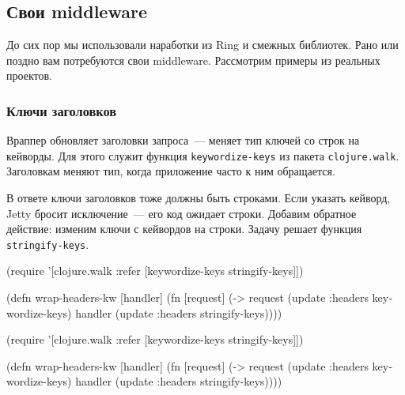 \subsection{Свои middleware}


До сих пор мы использовали наработки из Ring и смежных библиотек. Рано или
поздно вам потребуются свои middleware. Рассмотрим примеры из реальных проектов.

\subsubsection*{Ключи заголовков}


Враппер обновляет заголовки запроса~--- меняет тип ключей со строк на
кейворды. Для этого служит функция \verb|keywordize-keys| из пакета
\verb|clojure.walk|. Заголовкам меняют тип, когда приложение часто к ним
обращается.


В ответе ключи заголовков тоже должны быть строками. Если указать кейворд, Jetty
бросит исключение~--- его код ожидает строки. Добавим обратное действие: изменим
ключи с кейвордов на строки. Задачу решает функция \verb|stringify-keys|.


\ifx\DEVICETYPE\MOBILE

\begin{english}
  \begin{clojure}
(require
 '[clojure.walk :refer [keywordize-keys
                        stringify-keys]])

(defn wrap-headers-kw [handler]
  (fn [request]
    (-> request
        (update :headers keywordize-keys)
        handler
        (update :headers
                stringify-keys))))
  \end{clojure}
\end{english}

\else

\begin{english}
  \begin{clojure}
(require '[clojure.walk :refer
           [keywordize-keys stringify-keys]])

(defn wrap-headers-kw [handler]
  (fn [request]
    (-> request
        (update :headers keywordize-keys)
        handler
        (update :headers stringify-keys))))
  \end{clojure}
\end{english}

